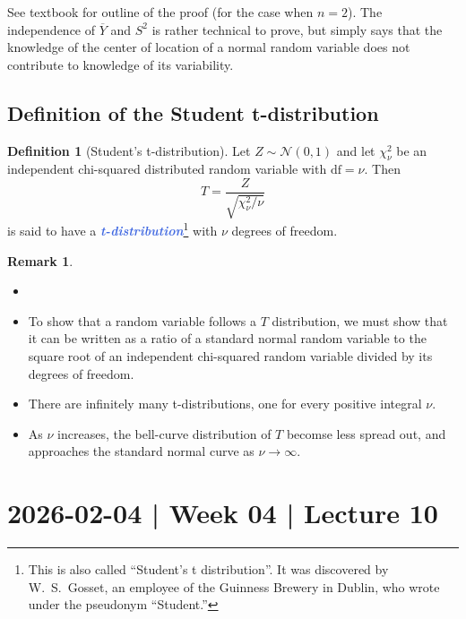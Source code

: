 \documentclass[10pt]{article}
\theoremstyle{definition}
\newtheorem{definition}[theorem]{Definition}
\newtheorem{remark}[theorem]{Remark}
\newcommand{\1}[1]{\textbf{1}_{\left[#1\right]}} %
\newcommand{\demph}[1]{\textcolor{RoyalBlue}{\textbf{\slshape #1}}} %
\begin{document}
See textbook for outline of the proof (for the case when $n=2$). The
independence of $\overline{Y}$ and $S^{2}$ is rather technical to prove, but
simply says that the knowledge of the center of location of a normal random
variable does not contribute to knowledge of its variability.



\subsection{Definition of the Student t-distribution}
\label{sec:definition-student-t-distribution}

\begin{definition}[Student's t-distribution]
  \label{def:students-t-distribution}
  Let $Z\sim \mathcal{N}(0,1)$ and let $\chi^{2}_{\nu}$ be an independent
  chi-squared distributed random variable with $\textrm{df}=\nu$. Then
  \begin{equation*}
    T = \frac{Z}{\sqrt{\chi^{2}_{\nu}/\nu}}
  \end{equation*}
  is said to have a \demph{t-distribution}\footnote{This is also called
    ``Student's t distribution''. It was discovered by W.~S.~Gosset, an
    employee of the Guinness Brewery in Dublin, who wrote under the pseudonym
    ``Student.''} with $\nu$ degrees of freedom.
\end{definition}



\begin{remark}
  \begin{itemize}
    \item []
    \item To show that a random variable follows a $T$ distribution, we must
    show that it can be written as a ratio of a standard normal random
    variable to the square root of an independent chi-squared random variable
    divided by its degrees of freedom.
    \item There are infinitely many t-distributions, one for every positive
    integral $\nu$.
    \item As $\nu$ increases, the bell-curve distribution of $T$ becomse less
    spread out, and approaches the standard normal curve as $\nu \to\infty$.
  \end{itemize}
\end{remark}

\newpage
\section{2026-02-04 | Week 04 | Lecture 10}
\end{document}

